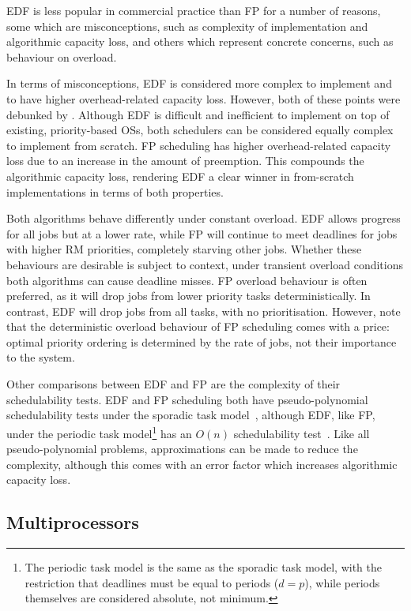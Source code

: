 \gls{EDF} is less popular in commercial practice than \gls{FP} for a number of reasons, some which
are misconceptions, such as complexity of implementation and algorithmic capacity loss, and others
which represent concrete concerns, such as behaviour on overload. 

In terms of misconceptions, \gls{EDF}
is considered more complex to implement and to have higher overhead-related capacity loss. 
However, both of these points were debunked by \citet{Buttazzo_05}.  Although \gls{EDF} is difficult
and inefficient to implement on top of existing, priority-based \glspl{OS}, both schedulers
can be considered equally complex to implement from scratch.  \gls{FP} scheduling has higher
overhead-related capacity loss due to an increase in the amount of preemption.  This compounds the
algorithmic capacity loss, rendering \gls{EDF} a clear winner in from-scratch implementations in
terms of both properties.

Both algorithms behave differently under constant
overload. \gls{EDF} allows progress for all jobs but at a lower rate, while \gls{FP} will
continue to meet deadlines for jobs with higher \gls{RM} priorities, completely starving other
jobs. Whether these behaviours are desirable is subject to context, under
transient overload conditions both algorithms can cause deadline misses. \gls{FP} overload behaviour
is often preferred, as it will drop jobs from lower priority tasks deterministically. In contrast,
\gls{EDF} will drop jobs from all tasks, with no prioritisation. However, note that the
deterministic overload behaviour of \gls{FP} scheduling comes with a price: optimal priority
ordering is determined by the rate of jobs, not their importance to the system. 

Other comparisons between \gls{EDF} and \gls{FP} are the complexity of their schedulability tests.
\gls{EDF} and \gls{FP} scheduling both have pseudo-polynomial
schedulability tests under the sporadic task model~\citep{Abdelzaher_SL_04}, although \gls{EDF},
like \gls{FP}, under the periodic task
model\footnote{The periodic task model is the same as the sporadic task model, with the restriction
that deadlines must be equal to periods ($d = p$), while periods themselves are considered absolute,
not minimum.} has an $O(n)$ schedulability test~\citep{Baruah_RH_90}.  Like all pseudo-polynomial problems,
approximations can be made to reduce the complexity, although this comes with an error factor which
increases algorithmic capacity loss.

\subsection{Multiprocessors}

